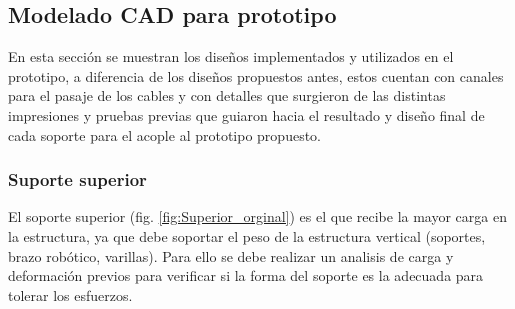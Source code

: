\subsection{Modelado CAD para prototipo}
En esta sección se muestran los diseños implementados y utilizados en el prototipo, a diferencia de los diseños propuestos antes, estos cuentan con canales para el pasaje de los cables y con detalles que surgieron de las distintas impresiones y pruebas previas que guiaron hacia el resultado y diseño final de cada soporte para el acople al prototipo propuesto.
\subsubsection{Suporte superior}
El soporte superior (fig. \ref{fig:Superior_orginal}) es el que recibe la mayor carga en la estructura, ya que debe soportar el peso de la estructura vertical (soportes, brazo robótico, varillas). Para ello se debe realizar un analisis de carga y deformación previos para verificar si la forma del soporte es la adecuada para tolerar los esfuerzos.
